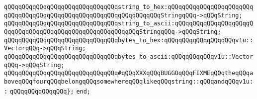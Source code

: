 \verb|qQQqqQQqqQQqqQQqqQQqqQQqqQQqqQQqstring_to_hex:qQQqqQQqqQQqqQQqqQQqqQQqqQQqqQQqqQQqqQQqqQQqqQQqqQQqqQQqqQQqqQQqqQQqStringqQQq->qQQqString;|\newline
\verb|qQQqqQQqqQQqqQQqqQQqqQQqqQQqqQQqstring_to_ascii:qQQqqQQqqQQqqQQqqQQqqQQqqQQqqQQqqQQqqQQqqQQqqQQqqQQqqQQqqQQqStringqQQq->qQQqString;|\newline
\newline
\verb|qQQqqQQqqQQqqQQqqQQqqQQqqQQqqQQqbytes_to_hex:qQQqqQQqqQQqqQQqqQQqv1u::VectorqQQq->qQQqString;|\newline
\verb|qQQqqQQqqQQqqQQqqQQqqQQqqQQqqQQqbytes_to_ascii:qQQqqQQqqQQqv1u::VectorqQQq->qQQqString;|\newline
\newline
\verb|qQQqqQQqqQQqqQQqqQQqqQQqqQQqqQQq#qQQqXXXqQQqBUGGOqQQqFIXMEqQQqtheqQQqaboveqQQqfourqQQqbelongqQQqsomewhereqQQqlikeqQQqstring::qQQqandqQQqv1u::|\newline
\verb|qQQqqQQqqQQqqQQq};|\newline
\newline
\verb|end;|\newline
\newline
\newline

